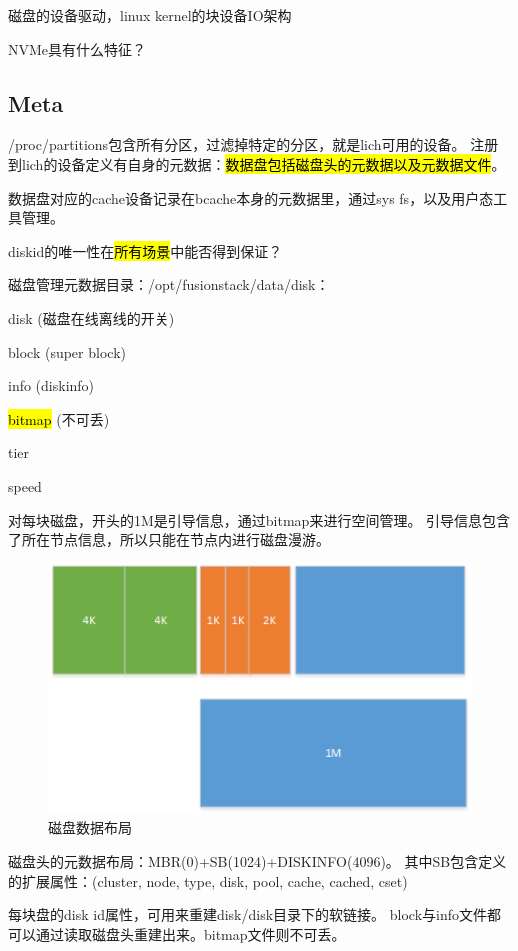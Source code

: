 磁盘的设备驱动，linux kernel的块设备IO架构

NVMe具有什么特征？

\subsection{Meta}

/proc/partitions包含所有分区，过滤掉特定的分区，就是lich可用的设备。
注册到lich的设备定义有自身的元数据：\hl{数据盘包括磁盘头的元数据以及元数据文件}。

数据盘对应的cache设备记录在bcache本身的元数据里，通过sys fs，以及用户态工具管理。

diskid的唯一性在\hl{所有场景}中能否得到保证？

磁盘管理元数据目录：/opt/fusionstack/data/disk：
\begin{compactitem}
\item disk (磁盘在线离线的开关)
\item block (super block)
\item info (diskinfo)
\item \hl{bitmap} (不可丢)
\item tier
\item speed
\end{compactitem}

对每块磁盘，开头的1M是引导信息，通过bitmap来进行空间管理。
引导信息包含了所在节点信息，所以只能在节点内进行磁盘漫游。

\begin{figure}[h]
    \centering
    \includegraphics{../imgs/disk_layout.png}
    \caption{磁盘数据布局}
\end{figure}

磁盘头的元数据布局：MBR(0)+SB(1024)+DISKINFO(4096)。
其中SB包含定义的扩展属性：(cluster, node, type, disk, pool, cache, cached, cset)

每块盘的disk id属性，可用来重建disk/disk目录下的软链接。
block与info文件都可以通过读取磁盘头重建出来。bitmap文件则不可丢。

